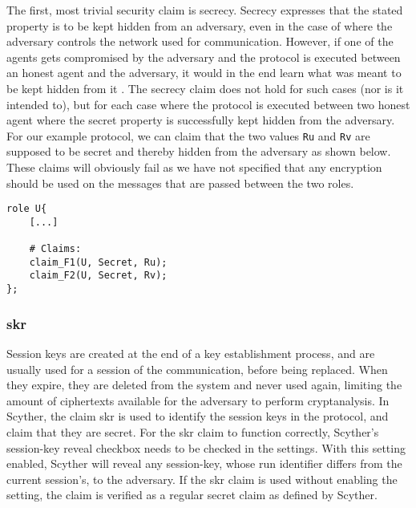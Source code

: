The first, most trivial security claim is secrecy. Secrecy expresses that the stated property is to be kept hidden from an adversary, even in the case of where the adversary controls the network used for communication. However, if one of the agents gets compromised by the adversary and the protocol is executed between an honest agent and the adversary, it would in the end learn what was meant to be kept hidden from it \cite{cremers2005operational}. The secrecy claim does not hold for such cases (nor is it intended to), but for each case where the protocol is executed between two honest agent where the secret property is successfully kept hidden from the adversary. For our example protocol, we can claim that the two values \texttt{Ru} and \texttt{Rv} are supposed to be secret and thereby hidden from the adversary as shown below. These claims will obviously fail as we have not specified that any encryption should be used on the messages that are passed between the two roles.\newline

\begin{lstlisting}
role U{
	[...]
	
	# Claims:
	claim_F1(U, Secret, Ru);
	claim_F2(U, Secret, Rv);
};
\end{lstlisting}




\subsubsection{\gls{skr}}

Session keys are created at the end of a key establishment process, and are usually used for a session of the communication, before being replaced. When they expire, they are deleted from the system and never used again, limiting the amount of ciphertexts available for the adversary to perform cryptanalysis. In Scyther, the claim \gls{skr} is used to identify the session keys in the protocol, and claim that they are secret. For the \gls{skr} claim to function correctly, Scyther's session-key reveal checkbox needs to be checked in the settings. With this setting enabled, Scyther will reveal any session-key, whose run identifier differs from the current session's, to the adversary. If the \gls{skr} claim is used without enabling the setting, the claim is verified as a regular secret claim as defined by Scyther. 




